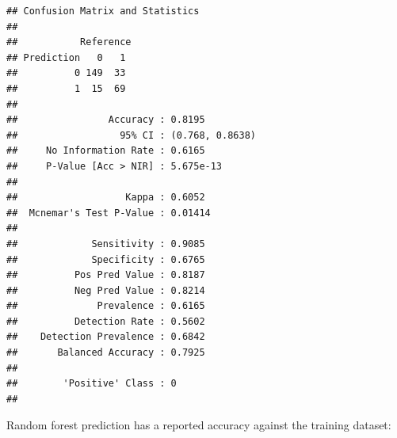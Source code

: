 \documentclass[]{article}
\newenvironment{Shaded}{\begin{snugshade}}{\end{snugshade}}
\newcommand{\KeywordTok}[1]{\textcolor[rgb]{0.13,0.29,0.53}{\textbf{{#1}}}}
\newcommand{\DataTypeTok}[1]{\textcolor[rgb]{0.13,0.29,0.53}{{#1}}}
\newcommand{\DecValTok}[1]{\textcolor[rgb]{0.00,0.00,0.81}{{#1}}}
\newcommand{\StringTok}[1]{\textcolor[rgb]{0.31,0.60,0.02}{{#1}}}
\newcommand{\NormalTok}[1]{{#1}}
\begin{document}
\begin{Shaded}
\end{Shaded}

\begin{verbatim}
## Confusion Matrix and Statistics
## 
##           Reference
## Prediction   0   1
##          0 149  33
##          1  15  69
##                                          
##                Accuracy : 0.8195         
##                  95% CI : (0.768, 0.8638)
##     No Information Rate : 0.6165         
##     P-Value [Acc > NIR] : 5.675e-13      
##                                          
##                   Kappa : 0.6052         
##  Mcnemar's Test P-Value : 0.01414        
##                                          
##             Sensitivity : 0.9085         
##             Specificity : 0.6765         
##          Pos Pred Value : 0.8187         
##          Neg Pred Value : 0.8214         
##              Prevalence : 0.6165         
##          Detection Rate : 0.5602         
##    Detection Prevalence : 0.6842         
##       Balanced Accuracy : 0.7925         
##                                          
##        'Positive' Class : 0              
## 
\end{verbatim}

Random forest prediction has a reported accuracy against the training
dataset:

\begin{Shaded}
\end{Shaded}
\end{document}
